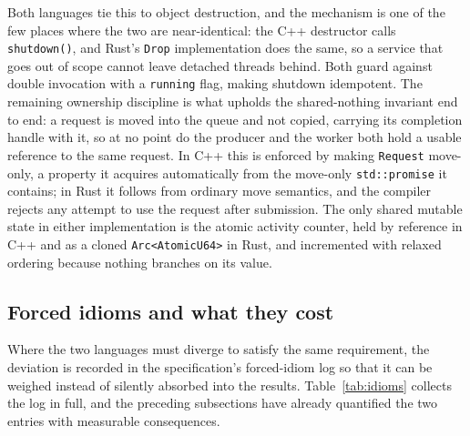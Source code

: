 \documentclass[english,twoside,openright,a4paper,censored,csm,software-track-2020]{HYthesisML}
\begin{document}
Both languages tie this to object destruction, and the mechanism is one of the few places
where the two are near-identical: the C++ destructor calls \texttt{shutdown()}, and Rust's
\texttt{Drop} implementation does the same, so a service that goes out of scope cannot leave
detached threads behind. Both guard against double invocation with a \texttt{running} flag,
making shutdown idempotent. The remaining ownership discipline is what upholds the
shared-nothing invariant end to end: a request is moved into the queue and not copied,
carrying its completion handle with it, so at no point do the producer and the worker both
hold a usable reference to the same request. In C++ this is enforced by making
\texttt{Request} move-only, a property it acquires automatically from the move-only
\texttt{std::promise} it contains; in Rust it follows from ordinary move semantics, and the
compiler rejects any attempt to use the request after submission. The only shared mutable
state in either implementation is the atomic activity counter, held by reference in C++ and
as a cloned \texttt{Arc<AtomicU64>} in Rust, and incremented with relaxed ordering because
nothing branches on its value.

\subsection{Forced idioms and what they cost}
\label{sec:idioms}
Where the two languages must diverge to satisfy the same requirement, the deviation is
recorded in the specification's forced-idiom log so that it can be weighed instead of
silently absorbed into the results. Table~\ref{tab:idioms} collects the log in full, and the
preceding subsections have already quantified the two entries with measurable consequences.
\end{document}
